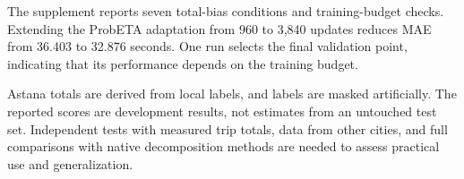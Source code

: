 The supplement reports seven total-bias conditions and training-budget checks. Extending the ProbETA adaptation from 960 to 3,840 updates reduces MAE from 36.403 to 32.876 seconds. One run selects the final validation point, indicating that its performance depends on the training budget.

Astana totals are derived from local labels, and labels are masked artificially. The reported scores are development results, not estimates from an untouched test set. Independent tests with measured trip totals, data from other cities, and full comparisons with native decomposition methods are needed to assess practical use and generalization.
